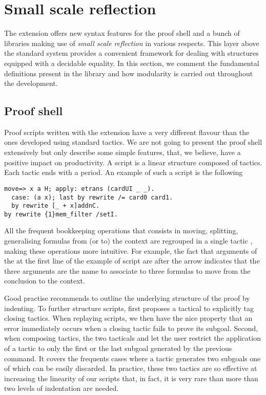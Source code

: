 \section{Small scale reflection}\label{sec:ssr}

The \ssr{} extension \cite{ssr} offers new syntax features for the
proof shell and a bunch of libraries making use of \emph{small scale
  reflection} in various respects. This layer above the standard
\Coq{} system provides a convenient framework for dealing with
structures equipped with a decidable equality. In this section, 
we comment the fundamental definitions present in the library and
how modularity is carried out throughout the development.

\subsection{Proof shell}\label{ssec:shell}

Proof scripts written with the \ssr{} extension have a very different
flavour than the ones developed using standard \Coq{} tactics. We are not 
going to present the proof shell extensively but only describe some 
simple features, that, we believe, have a positive impact on productivity.
A  script is a linear structure composed of tactics. Each tactic ends with
a period. 
An example of such a script is the following
\begin{lstlisting}
move=> x a H; apply: etrans (cardUI _ _).
  case: (a x); last by rewrite /= card0 card1.
  by rewrite [_ + x]addnC.
by rewrite {1}mem_filter /setI.
\end{lstlisting}
All the frequent bookkeeping operations that consists in moving, splitting, 
generalising formulas from (or to) the context are regrouped in 
a single tactic , making these operations more intuitive.
For example, the fact that arguments of the  at the first line of the example of
script are after the arrow indicates that the three arguments are the name to associate
to three formulas to move from the conclusion to the context.

Good practise recommends to outline the underlying structure
of the proof by indenting. To further structure scripts, \ssr{}
first proposes a tactical 
to explicitly tag closing tactics. 
When replaying scripts, we then have the nice property that
an error immediately occurs when a closing tactic fails to prove its subgoal. 
Second, when composing tactics, 
the two tacticals  and  let the user restrict the application of
a tactic to only the first or the last subgoal generated by the previous
command. It covers the frequents cases where a tactic generates 
two subgoals one of which can be easily discarded.
In practice, these two tactics 
are so effective at increasing the linearity of our scripts that,
in fact, it is very rare than more than two levels of indentation are needed.

